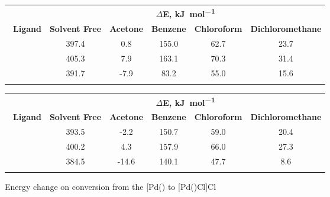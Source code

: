 \begin{figure}[htbp]
\begin{center}
\small
\caption[Energy change on conversion from the [Pd(\tBuxantphos)\ce{Cl2}{]} to [Pd(\tBuxantphos)Cl{]}Cl]{Energy change on conversion from the [Pd(\tBuxantphos)\ce{Cl2}{]} to [Pd(\tBuxantphos)Cl{]}Cl}
	\label{TheoryMCl2}
	\vspace{1em}
\begin{tabular}{l c c c c c}
	\toprule
	~ & \multicolumn{5}{c}{\bfseries{$\Delta$E, \si{\kilo\joule\per\mole}}} \\
	\cmidrule(lr){2-6} 
	~\bfseries{Ligand} & \bfseries{Solvent Free} & \bfseries{Acetone} &\bfseries{Benzene}&\bfseries{Chloroform} & \bfseries{Dichloromethane} \\
	\midrule		
	~\tBusixantphos 	& 397.4	& 0.8		& 155.0 	& 62.7	& 23.7\\
	~\tButhixantphos	& 405.3	& 7.9		& 163.1	& 70.3	& 31.4\\
	~\tBuxantphos		& 391.7	& -7.9	& 83.2	& 55.0	& 15.6\\
	\bottomrule{}
\end{tabular}

	\vspace{1em}
\begin{tabular}{l c c c c c}
	\toprule
	~ & \multicolumn{5}{c}{\bfseries{$\Delta$E, \si{\kilo\joule\per\mole}}} \\
	\cmidrule(lr){2-6} 
	~\bfseries{Ligand} & \bfseries{Solvent Free} & \bfseries{Acetone} &\bfseries{Benzene}&\bfseries{Chloroform} & \bfseries{Dichloromethane} \\
	\midrule		
	~\tBusixantphos 	& 393.5	& -2.2	& 150.7 	& 59.0	& 20.4\\
	~\tButhixantphos	& 400.2	& 4.3		& 157.9	& 66.0	& 27.3\\
	~\tBuxantphos		& 384.5	& -14.6	& 140.1	& 47.7	& 8.6\\
	\bottomrule{}
\end{tabular}
\label{comp:dichlorideresults}
\end{center}
\end{figure}

